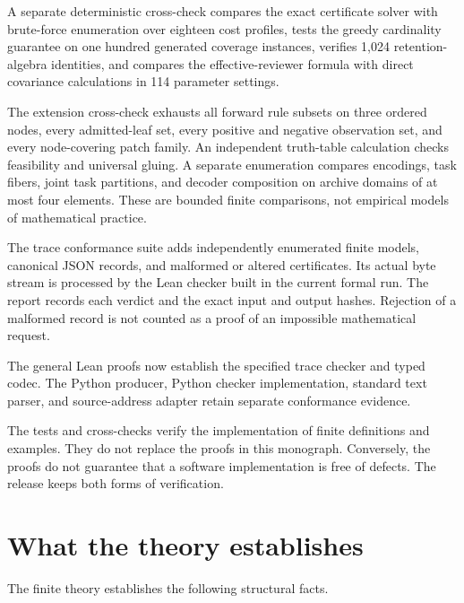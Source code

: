 A separate deterministic cross-check compares the exact certificate solver with brute-force enumeration over eighteen cost profiles, tests the greedy cardinality guarantee on one hundred generated coverage instances, verifies 1,024 retention-algebra identities, and compares the effective-reviewer formula with direct covariance calculations in 114 parameter settings.

The extension cross-check exhausts all forward rule subsets on three ordered nodes, every admitted-leaf set, every positive and negative observation set, and every node-covering patch family. An independent truth-table calculation checks feasibility and universal gluing. A separate enumeration compares encodings, task fibers, joint task partitions, and decoder composition on archive domains of at most four elements. These are bounded finite comparisons, not empirical models of mathematical practice.

The trace conformance suite adds independently enumerated finite models, canonical JSON records, and malformed or altered certificates. Its actual byte stream is processed by the Lean checker built in the current formal run. The report records each verdict and the exact input and output hashes. Rejection of a malformed record is not counted as a proof of an impossible mathematical request.

The general Lean proofs now establish the specified trace checker and typed codec. The Python producer, Python checker implementation, standard text parser, and source-address adapter retain separate conformance evidence.

The tests and cross-checks verify the implementation of finite definitions and examples. They do not replace the proofs in this monograph. Conversely, the proofs do not guarantee that a software implementation is free of defects. The release keeps both forms of verification.


\section{What the theory establishes}
\label{PPT:sec:old26}

The finite theory establishes the following structural facts.

